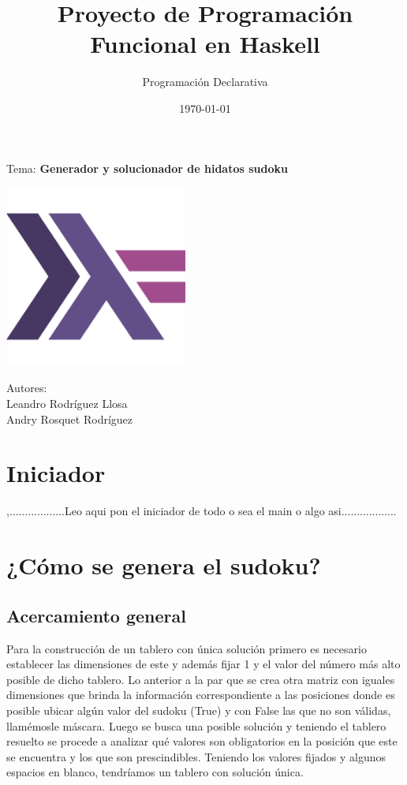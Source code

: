 \documentclass[10pt]{amsart}
\title{Proyecto de Programaci\'on Funcional en Haskell}
\author{Programaci\'on Declarativa}
\date{\today}
\begin{document}
	\begin{titlepage}
		\clearpage
		\maketitle
		
		\vspace{3em}
		\begin{center}
			Tema: \textbf{Generador y solucionador de hidatos sudoku} 	

            \vspace{6em}
			\begin{center}
        		\includegraphics[width=6cm]{haskell.png}
        	\end{center}

			\vspace{6em}
			Autores: \\
			Leandro Rodríguez Llosa \\
			Andry Rosquet Rodríguez
		\end{center}
		\thispagestyle{empty}
	\end{titlepage}

    \normalsize
 
	\small
	\section*{Iniciador}
	,..................Leo aqui pon el iniciador de todo o sea el main o algo asi.................. 
	\section*{ ¿C\'omo se genera el sudoku?}
	\subsection*{Acercamiento general}
	Para la construcci\'on de un tablero con \'unica soluci\'on primero es necesario establecer las dimensiones de este y adem\'as fijar 1 y el valor del n\'umero m\'as alto posible de dicho tablero. Lo anterior a la par que se crea otra matriz con iguales dimensiones que brinda la informaci\'on correspondiente a las posiciones donde es posible ubicar alg\'un valor del sudoku (True) y con False las que no son v\'alidas, llam\'emosle m\'ascara. Luego se busca una posible soluci\'on y teniendo el tablero resuelto se procede a analizar qu\'e valores son obligatorios en la posici\'on que este se encuentra y los que son prescindibles. Teniendo los valores fijados y algunos espacios en blanco, tendr\'iamos un tablero con soluci\'on \'unica.
\end{document}
